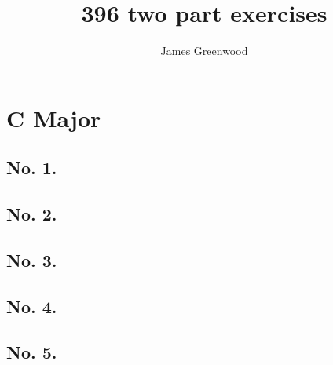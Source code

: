 \documentclass[a4paper]{article}
\title{396 two part exercises}
\author{James Greenwood}
\begin{document}
\maketitle

\section{C Major}

\subsection{No. 1.}

{%
\parindent 0pt
\noindent
\ifx\preLilyPondExample \undefined
\else
  \expandafter\preLilyPondExample
\fi
\def\lilypondbook{}%

\ifx\postLilyPondExample \undefined
\else
  \expandafter\postLilyPondExample
\fi
}

\subsection{No. 2.}

{%
\parindent 0pt
\noindent
\ifx\preLilyPondExample \undefined
\else
  \expandafter\preLilyPondExample
\fi
\def\lilypondbook{}%

\ifx\postLilyPondExample \undefined
\else
  \expandafter\postLilyPondExample
\fi
}

\subsection{No. 3.}

{%
\parindent 0pt
\noindent
\ifx\preLilyPondExample \undefined
\else
  \expandafter\preLilyPondExample
\fi
\def\lilypondbook{}%

\ifx\postLilyPondExample \undefined
\else
  \expandafter\postLilyPondExample
\fi
}

\subsection{No. 4.}

{%
\parindent 0pt
\noindent
\ifx\preLilyPondExample \undefined
\else
  \expandafter\preLilyPondExample
\fi
\def\lilypondbook{}%

\ifx\postLilyPondExample \undefined
\else
  \expandafter\postLilyPondExample
\fi
}

\subsection{No. 5.}
\end{document}
